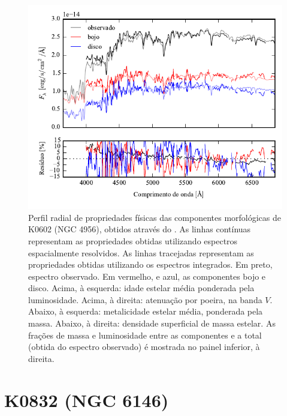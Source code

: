 \begin{figure}
	\includegraphics[page=8]{figuras/sample006a_synthesis}
	\caption[Propriedades físicas das componentes morfológicas de K0602 (NGC 4956)]
	{Perfil radial de propriedades físicas das componentes morfológicas de
	K0602 (NGC 4956), obtidos através do \starlight. As linhas contínuas
	representam as propriedades obtidas utilizando espectros espacialmente
	resolvidos. As linhas tracejadas representam as propriedades obtidas utilizando
	os espectros integrados. Em preto, espectro observado. Em vermelho, e azul, as
	componentes bojo e disco. Acima, à esquerda: idade estelar média ponderada pela
	luminosidade. Acima, à direita: atenuação por poeira, na banda $V$. Abaixo, à
	esquerda: metalicidade estelar média, ponderada pela massa. Abaixo, à direita:
	densidade superficial de massa estelar. As frações de massa e luminosidade
	entre as componentes e a total (obtida do espectro observado) é mostrada no
	painel inferior, à direita.}
	\label{fig:decompSinteseRadprof:K0602}
\end{figure}

\FloatBarrier


\section{K0832 (NGC 6146)}
\label{apendice:Decomp:K0832}

